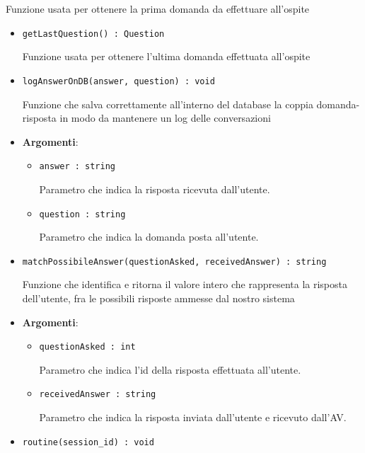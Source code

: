 \documentclass[../DefinizioneDiProdotto.tex]{subfiles}
\begin{document}
\begin{itemize}
\begin{itemize}
\begin{itemize}
	 Funzione usata per ottenere la prima domanda da effettuare all'ospite

	\end{itemize}\vspace{0.5em}
	\begin{itemize}
	\item \texttt{getLastQuestion() : Question}\

	 Funzione usata per ottenere l'ultima domanda effettuata all'ospite
	\end{itemize}\vspace{0.5em}
	\begin{itemize}
	\item \texttt{logAnswerOnDB(answer, question) : void}\

	 Funzione che salva correttamente all'interno del database la coppia domanda-risposta in modo da mantenere un log delle conversazioni

	\item \textbf{Argomenti}:
	\begin{itemize}
	\item \texttt{answer : string}\

	 Parametro che indica la risposta ricevuta dall'utente.
	\item \texttt{question : string}\

	 Parametro che indica la domanda posta all'utente.
	\end{itemize}
	\end{itemize}\vspace{0.5em}
	\begin{itemize}
	\item \texttt{matchPossibileAnswer(questionAsked, receivedAnswer) : string}\

	 Funzione che identifica e ritorna il valore intero che rappresenta la risposta dell'utente, fra le possibili risposte ammesse dal nostro sistema

	\item \textbf{Argomenti}:
	\begin{itemize}
	\item \texttt{questionAsked : int}\

	 Parametro che indica l'id della risposta effettuata all'utente.
	\item \texttt{receivedAnswer : string}\

	 Parametro che indica la risposta inviata dall'utente e ricevuto dall'AV.
	\end{itemize}
	\end{itemize}\vspace{0.5em}
	\begin{itemize}
	\item \texttt{routine(session\_id) : void}\


\end{itemize}
\end{itemize}
\end{itemize}
\end{document}
